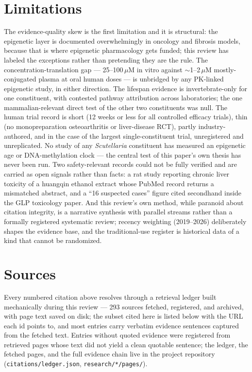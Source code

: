 \section{Limitations}
\label{sec:limits}

The evidence-quality skew is the first limitation and it is structural: the epigenetic layer is documented overwhelmingly in oncology and fibrosis models, because that is where epigenetic pharmacology gets funded; this review has labeled the exceptions rather than pretending they are the rule. The concentration-translation gap --- 25--100\,$\mu$M in vitro against $\sim$1--2\,$\mu$M mostly-conjugated plasma at oral human doses --- is unbridged by any PK-linked epigenetic study, in either direction. The lifespan evidence is invertebrate-only for one constituent, with contested pathway attribution across laboratories; the one mammalian-relevant direct test of the other two constituents was null. The human trial record is short (12 weeks or less for all controlled efficacy trials), thin (no monopreparation osteoarthritis or liver-disease RCT), partly industry-authored, and in the case of the largest single-constituent trial, unregistered and unreplicated. No study of any \textit{Scutellaria} constituent has measured an epigenetic age or DNA-methylation clock --- the central test of this paper's own thesis has never been run. Two safety-relevant records could not be fully verified and are carried as open signals rather than facts: a rat study reporting chronic liver toxicity of a huangqin ethanol extract whose PubMed record returns a mismatched abstract, and a ``16 suspected cases'' figure cited secondhand inside the GLP toxicology paper. And this review's own method, while paranoid about citation integrity, is a narrative synthesis with parallel streams rather than a formally registered systematic review; recency weighting (2019--2026) deliberately shapes the evidence base, and the traditional-use register is historical data of a kind that cannot be randomized.

\section*{Sources}

\footnotesize
\noindent
Every numbered citation above resolves through a retrieval ledger built mechanically during this review --- 293 sources fetched, registered, and archived, with page text saved on disk; the subset cited here is listed below with the URL each id points to, and most entries carry verbatim evidence sentences captured from the fetched text. Entries without quoted evidence were registered from retrieved pages whose text did not yield a clean quotable sentence; the ledger, the fetched pages, and the full evidence chain live in the project repository (\texttt{citations/ledger.json}, \texttt{research/*/pages/}).

\vspace{0.5em}

